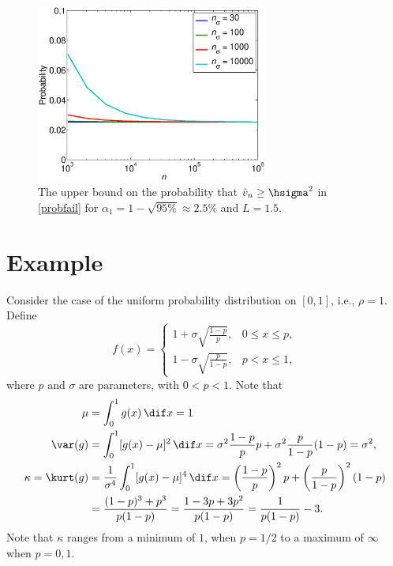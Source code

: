 \documentclass[12pt]{amsart}
\newcommand{\hv}{\hat{v}}
\begin{document}
\begin{figure}
\centering
\includegraphics[width=3in]{probfailfig.eps}
\caption{The upper bound on the probability that $\hv_n \ge \hsigma^2$ in \eqref{probfail} for $\alpha_1 = 1 - \sqrt{95\%} \approx 2.5\%$ and $L=1.5$. \label{probfailfig}}
\end{figure}




\section{Example}

Consider the case of the uniform probability distribution on $[0,1]$, i.e., $\rho=1$.  Define
\begin{equation} \label{exampleeq}
f(x) = \begin{cases} 1 + \sigma \sqrt{\frac{1-p}{p}}, & 0 \le x \le p,\\
1 - \sigma \sqrt{\frac{p}{1-p}}, & p < x \le 1,
\end{cases}
\end{equation}
where $p$ and $\sigma$ are parameters, with $0 < p < 1$.
Note that
\begin{align*}
\mu &= \int_0^1 g(x) \, \dif x = 1\\
\var(g) &= \int_0^1 [g(x)-\mu]^2 \, \dif x = \sigma^2 \frac{1-p}{p} p + \sigma^2 \frac{p}{1-p} (1-p) = \sigma^2, \\
\kappa = \kurt(g) &= \frac{1}{\sigma^4}\int_0^1 [g(x)-\mu]^4 \, \dif x = \left(\frac{1-p}{p}\right)^2 p + \left(\frac{p}{1-p} \right)^2 (1-p) \\
& = \frac{(1-p)^3 + p^3}{p(1-p)} = \frac{1-3p+3p^2}{p(1-p)} = \frac{1}{p(1-p)} - 3.
\end{align*}
Note that $\kappa$ ranges from a minimum of $1$, when $p=1/2$ to a maximum of $\infty$ when $p=0,1$.
\end{document}
